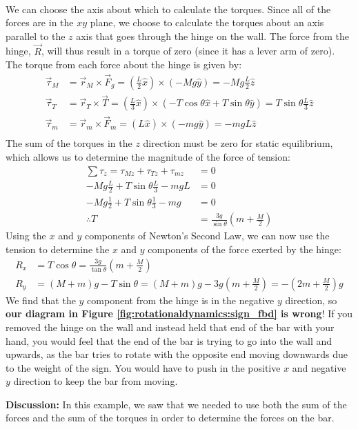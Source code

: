 \begin{example}
\begin{align*}
\end{align*}
We can choose the axis about which to calculate the torques. Since all of the forces are in the $xy$ plane, we choose to calculate the torques about an axis parallel to the $z$ axis that goes through the hinge on the wall. The force from the hinge, $\vec R$, will thus result in a torque of zero (since it has a lever arm of zero). The torque from each force about the hinge is given by:
\begin{align*}
\vec \tau_M &= \vec r_M \times \vec F_g = \left(\frac{L}{2}\hat x\right) \times (-Mg \hat y) =-Mg\frac{L}{2} \hat z\\
\vec \tau_T &= \vec r_T \times \vec T = \left(\frac{L}{3}\hat x\right) \times (-T\cos\theta \hat x + T\sin\theta \hat y) =T\sin\theta\frac{L}{3} \hat z\\
\vec \tau_m &= \vec r_m \times \vec F_m = (L\hat x) \times (-mg \hat y) =-mgL\hat z\\
\end{align*}
The sum of the torques in the $z$ direction must be zero for static equilibrium, which allows us to determine the magnitude of the force of tension:
\begin{align*}
\sum \tau_z = \tau_{Mz} + \tau_{Tz}+ \tau_{mz} &=0\\
-Mg\frac{L}{2} + T\sin\theta\frac{L}{3} -mgL &=0\\
-Mg\frac{1}{2} + T\sin\theta\frac{1}{3} -mg &=0\\
\therefore T&= \frac{3g}{\sin\theta} \left( m + \frac{M}{2}\right)
\end{align*}
Using the $x$ and $y$ components of Newton's Second Law, we can now use the tension to determine the $x$ and $y$ components of the force exerted by the hinge:
\begin{align*}
R_x &= T\cos\theta = \frac{3g}{\tan\theta} \left( m + \frac{M}{2}\right)\\
R_y &= (M+m)g - T\sin\theta = (M+m)g - 3g \left( m + \frac{M}{2}\right)=  -\left( 2m + \frac{M}{2}\right)g
\end{align*}
We find that the $y$ component from the hinge is in the negative $y$ direction, so \textbf{our diagram in Figure \ref{fig:rotationaldynamics:sign_fbd} is wrong}! If you removed the hinge on the wall and instead held that end of the bar with your hand, you would feel that the end of the bar is trying to go into the wall and upwards, as the bar tries to rotate with the opposite end moving downwards due to the weight of the sign. You would have to push in the positive $x$ and negative $y$ direction to keep the bar from moving. 

\textbf{Discussion: }In this example, we saw that we needed to use both the sum of the forces and the sum of the torques in order to determine the forces on the bar. 
\end{example}

